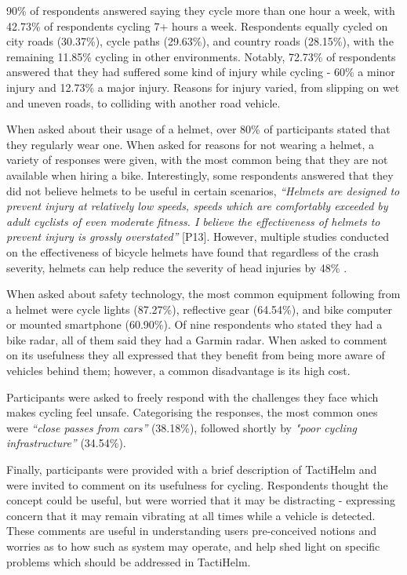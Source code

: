 \documentclass{interim}
\begin{document}
90\% of respondents answered saying they cycle more than one hour a week, with 42.73\% of respondents cycling 7+ hours a week. Respondents equally cycled on city roads (30.37\%), cycle paths (29.63\%), and country roads (28.15\%), with the remaining 11.85\% cycling in other environments. Notably, 72.73\% of respondents answered that they had suffered some kind of injury while cycling - 60\% a minor injury and 12.73\% a major injury. Reasons for injury varied, from slipping on wet and uneven roads, to colliding with another road vehicle.

When asked about their usage of a helmet, over 80\% of participants stated that they regularly wear one. When asked for reasons for not wearing a helmet, a variety of responses were given, with the most common being that they are not available when hiring a bike. Interestingly, some respondents answered that they did not believe helmets to be useful in certain scenarios, \textit{“Helmets are designed to prevent injury at relatively low speeds, speeds which are comfortably exceeded by adult cyclists of even moderate fitness. I believe the effectiveness of helmets to prevent injury is grossly overstated”} [P13]. However, multiple studies conducted on the effectiveness of bicycle helmets \cite{10.1093/ije/dyw153, HOYE201885, HOYE2018239, buth2023effectiveness} have found that regardless of the crash severity, helmets can help reduce the severity of head injuries by 48\% \cite{HOYE201885}.

When asked about safety technology, the most common equipment following from a helmet were cycle lights (87.27\%), reflective gear (64.54\%), and bike computer or mounted smartphone (60.90\%). Of nine respondents who stated they had a bike radar, all of them said they had a Garmin radar. When asked to comment on its usefulness they all expressed that they benefit from being more aware of vehicles behind them; however, a common disadvantage is its high cost.

Participants were asked to freely respond with the challenges they face which makes cycling feel unsafe. Categorising the responses, the most common ones were \textit{“close passes from cars”} (38.18\%), followed shortly by \textit{"poor cycling infrastructure”} (34.54\%).

Finally, participants were provided with a brief description of TactiHelm and were invited to comment on its usefulness for cycling. Respondents thought the concept could be useful, but were worried that it may be distracting - expressing concern that it may remain vibrating at all times while a vehicle is detected. These comments are useful in understanding users pre-conceived notions and worries as to how such as system may operate, and help shed light on specific problems which should be addressed in TactiHelm.
\end{document}
